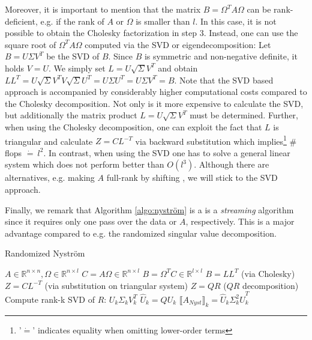 \documentclass{article}
\theoremstyle{definition}
\begin{document}
 Moreover, it is important to mention that the matrix $B = \Omega^T A \Omega$ can be rank-deficient, e.g. if the rank of $A$ or $\Omega$ is smaller than $l$. In this case, it is not possible to obtain the Cholesky factorization in step 3. Instead, one can use the square root of $\Omega^T A \Omega$ computed via the SVD or eigendecomposition: Let $B = U \Sigma V^T$ be the SVD of $B$. Since $B$ is symmetric and non-negative definite, it holds $V = U$. We simply set $L = U \sqrt{\Sigma} V^T$ and obtain $LL^T = U \sqrt{\Sigma} V^T V \sqrt{\Sigma} U^T = U \Sigma U^T = U \Sigma V^T = B$. Note that the SVD based approach is accompanied by considerably higher computational costs compared to the Cholesky decomposition. Not only is it more expensive to calculate the SVD, but additionally the matrix product $L = U \sqrt{\Sigma} V^T$ must be determined. Further, when using the Cholesky decomposition, one can exploit the fact that $L$ is triangular and calculate $Z = C L^{-T}$ via backward substitution which implies\footnote{'$\dot{=}$' indicates equality when omitting lower-order terms} \# flops $\dot{=}\ l^2$. In contrast, when using the SVD one has to solve a general linear system which does not perform better than $O(l^3)$. Although there are alternatives, e.g. making $A$ full-rank by shifting \cite{tropp2017fixedrank}, we will stick to the SVD approach.
 
 Finally, we remark that Algorithm \ref{algo:nyström} is a is a \textit{streaming} algorithm since it requires only one pass over the data or $A$, respectively. This is a major advantage compared to e.g. the randomized singular value decomposition.
\begin{algorithm}[t]
    \caption{Randomized Nyström} \label{algo:nyström}
    \begin{algorithmic}[1]
        \Require $A \in \mathbb{R}^{n \times n}, \Omega \in \mathbb{R}^{n \times l}$
        \State $C = A \Omega \in \mathbb{R}^{n \times l}$
        \State $B = \Omega^T C \in \mathbb{R}^{l \times l}$
        \State $B = LL^T$ (via Cholesky)
        \State $Z = C L^{-T}$ (via substitution on triangular system)
        \State $Z = QR$ ($QR$ decomposition)
        \State Compute rank-k SVD of $R$: $U_k \Sigma_k V_k^T$
        \State $\hat{U}_k = Q U_k$
        \Ensure $\llbracket A_{Nyst}\rrbracket_k = \hat{U}_k \Sigma_k^2 \hat{U}_k^T$
    \end{algorithmic}
\end{algorithm}
\end{document}
